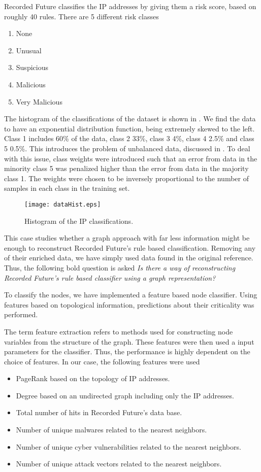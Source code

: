 Recorded Future classifies the IP addresses by giving them a risk score, based on roughly 40 rules. There are 5 different risk classes
\begin{enumerate}
    \item None
    \item Unusual
    \item Suspicious
    \item Malicious
    \item Very Malicious
\end{enumerate}

The histogram of the classifications of the dataset is shown in . We find the data to have an exponential distribution function, being extremely skewed to the left. Class 1 includes 60\% of the data, class 2 33\%, class 3 4\%, class 4 2.5\% and class 5 0.5\%. This introduces the problem of unbalanced data, discussed in . To deal with this issue, class weights were introduced such that an error from data in the minority class 5 was penalized higher than the error from data in the majority class 1. The weights were chosen to be inversely proportional to the number of samples in each class in the training set.

\begin{figure}[h!]
    \centering
    \texttt{[image: dataHist.eps]}
    \caption{Histogram of the IP classifications.}
    \label{hist}
\end{figure}

This case studies whether a graph approach with far less information might be enough to reconstruct Recorded Future's rule based classification. Removing any of their enriched data, we have simply used data found in the original reference. Thus, the following bold question is asked \textit{Is there a way of reconstructing Recorded Future's rule based classifier using a graph representation?} 

To classify the nodes, we have implemented a feature based node classifier. Using features based on topological information, predictions about their criticality was performed.

The term feature extraction refers to methods used for constructing node variables from the structure of the graph. These features were then used a input parameters for the classifier. Thus, the performance is highly dependent on the choice of features. In our case, the following features were used
\begin{itemize}
    \item PageRank based on the topology of IP addresses.
    \item Degree based on an undirected graph including only the IP addresses.
    \item Total number of hits in Recorded Future's data base.
    \item Number of unique malwares related to the nearest neighbors.
    \item Number of unique cyber vulnerabilities related to the nearest neighbors.
    \item Number of unique attack vectors related to the nearest neighbors.
\end{itemize}

